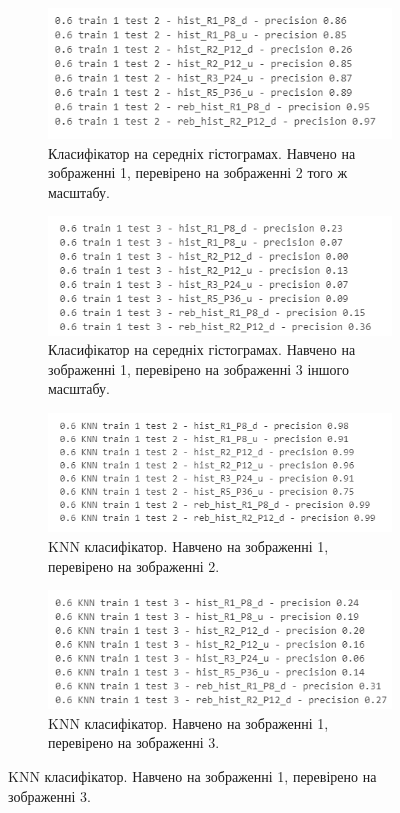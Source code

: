 \begin{figure}[h]
    \begin{subfigure}{0.5\textwidth}
    \includegraphics[width=0.95\linewidth]{img/precision-3.png} 
    \caption{
        Класифікатор на середніх гістограмах. Навчено на зображенні 1, перевірено на зображенні 2 того ж масштабу.
    }
    \end{subfigure}%
    \begin{subfigure}{0.5\textwidth}
    \includegraphics[width=0.95\linewidth]{img/precision-4.png}
    \caption{
        Класифікатор на середніх гістограмах. Навчено на зображенні 1, перевірено на зображенні 3 іншого масштабу.
    }
    \end{subfigure}

    \begin{subfigure}{0.5\textwidth}
    \includegraphics[width=0.95\linewidth]{img/precision-3-knn.png} 
    \caption{
        KNN класифікатор. Навчено на зображенні 1, перевірено на зображенні 2.
    }
    \end{subfigure}%
    \begin{subfigure}{0.5\textwidth}
    \includegraphics[width=0.95\linewidth]{img/precision-4-knn.png}
    \caption{
        KNN класифікатор. Навчено на зображенні 1, перевірено на зображенні 3.
    }
    \end{subfigure}
    

\end{figure}
